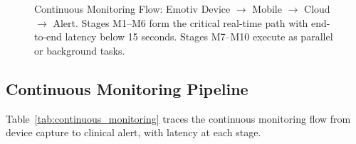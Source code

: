 \begin{figure}[!htbp]
{%
}%
\caption[Continuous Monitoring Flow: Emotiv to Cloud Alert]{Continuous Monitoring Flow: Emotiv Device $\to$ Mobile $\to$ Cloud $\to$ Alert.
Stages M1--M6 form the critical real-time path with end-to-end latency below 15 seconds.
Stages M7--M10 execute as parallel or background tasks.}
\label{fig:ch1_continuous_monitoring}
\end{figure}

\iffalse %
\subsection{Continuous Monitoring Pipeline}
\label{sec:continuous_monitoring_flow}

Table~\ref{tab:continuous_monitoring} traces the continuous monitoring flow from device capture to clinical alert, with latency at each stage.


